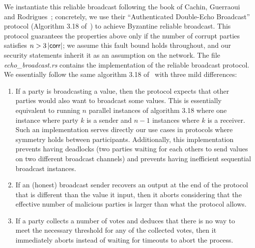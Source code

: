 We instantiate this reliable broadcast following the book of Cachin, Guerraoui and
Rodrigues~\cite{CGR11}; concretely, we use their ``Authenticated Double-Echo Broadcast''
protocol (Algorithm 3.18 of~\cite{CGR11}) to achieve Byzantine reliable broadcast.
This protocol guarantees the properties above only if the number of corrupt parties satisfies
$n > 3\,\lvert\mathsf{corr}\rvert$; we assume this fault bound holds throughout, and our security
statements inherit it as an assumption on the network.
The file \textit{echo\_broadcast.rs} contains the implementation of the reliable broadcast protocol.
We essentially follow the same algorithm 3.18 of~\cite{CGR11} with three mild differences:
\begin{enumerate}
\item If a party is broadcasting a value, then the protocol expects that other parties would also want to broadcast some values. This is essentially equivalent to running $n$ parallel instances of algorithm 3.18 where one instance where party $k$ is a sender and $n-1$ instances where $k$ is a receiver. Such an implementation serves directly our use cases in protocols where symmetry holds between participants. Additionally, this implementation prevents having deadlocks (two parties waiting for each others to send values on two different broadcast channels) and prevents having inefficient sequential broadcast instances.
\item If an (honest) broadcast sender recovers an output at the end of the protocol that is different than
the value it input, then it aborts considering that the effective number of malicious parties is larger than what the
protocol allows.
\item If a party collects a number of votes and deduces that there is no way to meet the necessary threshold for any of
the collected votes, then it immediately aborts instead of waiting for timeouts to abort the process.
\end{enumerate}

